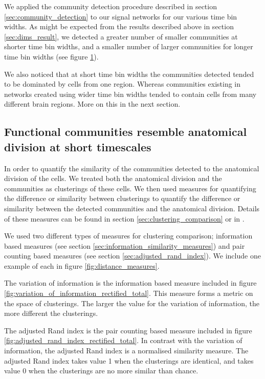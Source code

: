 \documentclass[a4paper,12pt]{article}
\theoremstyle{definition}
\begin{document}
\begin{figure}
    \label{fig:consensus_clusterings_with_regions}
  \end{figure}

  We applied the community detection procedure described in section \ref{sec:community_detection} to our signal networks for our various time bin widths. As might be expected from the results described above in section \ref{sec:dims_result}, we detected a greater number of smaller communities at shorter time bin widths, and a smaller number of larger communities for longer time bin widths (see figure \ref{fig:consensus_clusterings_with_regions}).

  We also noticed that at short time bin widths the communities detected tended to be dominated by cells from one region. Whereas communities existing in networks created using wider time bin widths tended to contain cells from many different brain regions. More on this in the next section.


  \subsection{Functional communities resemble anatomical division at short timescales}
  In order to quantify the similarity of the communities detected to the anatomical division of the cells. We treated both the anatomical division and the communities as clusterings of these cells. We then used measures for quantifying the difference or similarity between clusterings to quantify the difference or similarity between the detected communities and the anatomical division. Details of these measures can be found in section \ref{sec:clustering_comparison} or in \cite{vinh}.

  We used two different types of measures for clustering comparison; information based measures (see section \ref{sec:information_similarity_measures}) and pair counting based measures (see section \ref{sec:adjusted_rand_index}). We include one example of each in figure \ref{fig:distance_measures}.

  The variation of information is the information based measure included in figure \ref{fig:variation_of_information_rectified_total}. This measure forms a metric on the space of clusterings. The larger the value for the variation of information, the more different the clusterings.

  The adjusted Rand index is the pair counting based measure included in figure \ref{fig:adjusted_rand_index_rectified_total}. In contrast with the variation of information, the adjusted Rand index is a normalised similarity measure. The adjusted Rand index takes value 1 when the clusterings are identical, and takes value 0 when the clusterings are no more similar than chance.
\end{document}
